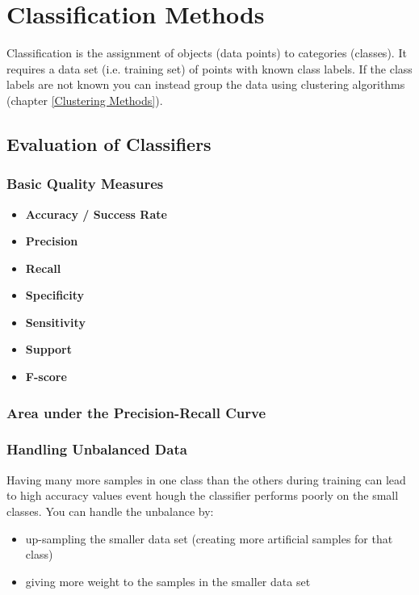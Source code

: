 \documentclass[../main.tex]{subfiles}
\begin{document}
\section{Classification Methods}
Classification is the assignment of objects (data points) to categories (classes). It requires a data set (i.e. training set) of points with known class labels. If the class labels are not known you can instead group the data using clustering algorithms (chapter \ref{Clustering Methods}).

\subsection{Evaluation of Classifiers}
\subsubsection{Basic Quality Measures}
\begin{itemize}
    \item[] \textbf{Accuracy / Success Rate} 
    \item[] \textbf{Precision}
    \item[] \textbf{Recall}
    \item[] \textbf{Specificity}
    \item[] \textbf{Sensitivity}
    \item[] \textbf{Support}
    \item[] \textbf{F-score}
\end{itemize}

\subsubsection{Area under the Precision-Recall Curve}

\subsubsection{Handling Unbalanced Data}
Having many more samples in one class than the others during training can lead to high accuracy values event hough the classifier performs poorly on the small classes. You can handle the unbalance by:
\begin{itemize}
    \item up-sampling the smaller data set (creating more artificial samples for that class)
    \item giving more weight to the samples in the smaller data set
\end{itemize}
\end{document}
